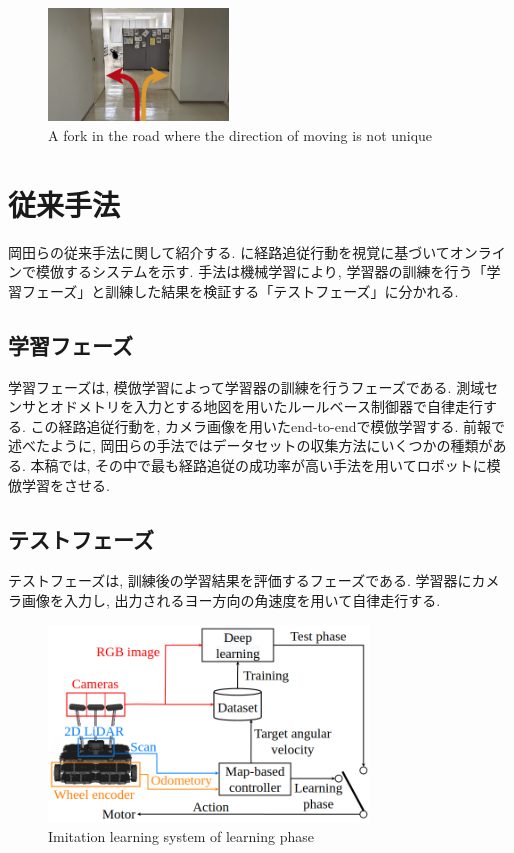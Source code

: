 \documentclass{jarticle}
\begin{document}
\begin{figure}[h]
 \centering
  \includegraphics[height=30mm]{road.png}
  \vspace*{-4mm}
  \caption{A fork in the road where the direction of moving is not unique}
  \label{fig: fig1}
\end{figure}

\section{従来手法}
岡田らの従来手法に関して紹介する. に経路追従行動を視覚に基づいてオンラインで模倣するシステムを示す. 手法は機械学習により, 学習器の訓練を行う「学習フェーズ」と訓練した結果を検証する「テストフェーズ」に分かれる.

\subsection{学習フェーズ}
学習フェーズは, 模倣学習によって学習器の訓練を行うフェーズである. 測域センサとオドメトリを入力とする地図を用いたルールベース制御器で自律走行する. この経路追従行動を, カメラ画像を用いたend-to-endで模倣学習する. 前報\cite{okada2}で述べたように, 岡田らの手法ではデータセットの収集方法にいくつかの種類がある. 本稿では, その中で最も経路追従の成功率が高い手法を用いてロボットに模倣学習をさせる.

\subsection{テストフェーズ}
テストフェーズは, 訓練後の学習結果を評価するフェーズである. 学習器にカメラ画像を入力し, 出力されるヨー方向の角速度を用いて自律走行する.

\begin{figure}[h]
  \centering
   \includegraphics[width=85mm]{system.png}
   \vspace*{-4mm}
   \caption{Imitation learning system of learning phase}
   \label{fig: fig2}
 \end{figure}
\end{document}
